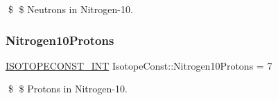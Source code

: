 \$ \$ Neutrons in Nitrogen-\/10. \mbox{\label{group___isotope_const-_nitrogen-_n10_ga22dc3e26f8d736121fa41d24dacdaf8a}} 
\subsubsection{\texorpdfstring{Nitrogen10\+Protons}{Nitrogen10Protons}}
{\footnotesize\ttfamily \mbox{\hyperlink{group___isotope_const-_macros_ga5f18360b3e99483a35c32d789e62621c}{I\+S\+O\+T\+O\+P\+E\+C\+O\+N\+S\+T\+\_\+\+I\+NT}} Isotope\+Const\+::\+Nitrogen10\+Protons = 7}

\$ \$ Protons in Nitrogen-\/10. 